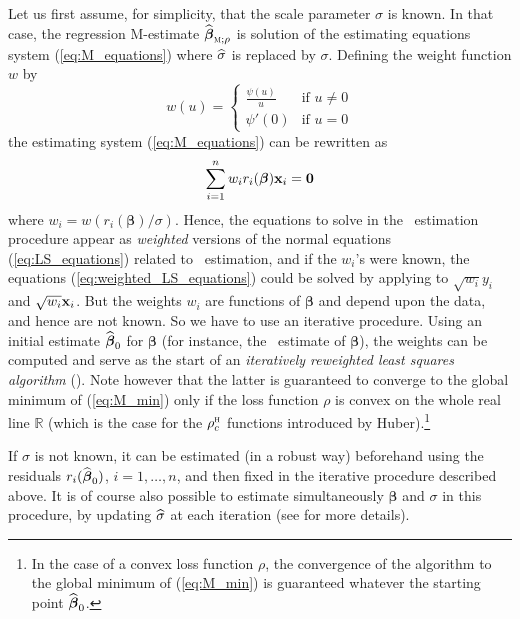 Let us first assume, for simplicity, that the scale parameter $\sigma$ is
known. In that case, the regression M-estimate
$\sthat{\boldsymbol\beta}_{\stsc{M};\rho}$ is solution of the estimating
equations system (\ref{eq:M_equations}) where $\widehat{\sigma}$ is replaced by
$\sigma$. Defining the weight function $w$ by
\[
    w(u) = 
    \begin{cases}
        \frac{\psi(u)}{u} & \text{if $u\neq0$}\\
        \psi'(0)          & \text{if $u=0$}
    \end{cases}
\]
the estimating system (\ref{eq:M_equations}) can be rewritten as
%
\begin{equation}\label{eq:weighted_LS_equations}
    \sum_{i=1}^{n} w_i r_i(\boldsymbol\beta) \mathbf x_i = \mathbf 0
\end{equation}
%
where $w_i = w(r_i(\boldsymbol\beta)/\sigma)$. Hence, the equations to solve in
the ~estimation procedure appear as \emph{weighted} versions of the
normal equations (\ref{eq:LS_equations}) related to ~estimation, and
if the $w_i$'s were known, the equations (\ref{eq:weighted_LS_equations}) could
be solved by applying  to $\sqrt{w_i}y_i$ and $\sqrt{w_i}\mathbf x_i$.
But the weights $w_i$ are functions of $\boldsymbol\beta$ and depend upon the
data, and hence are not known. So we have to use an iterative procedure. Using
an initial estimate $\widehat{\boldsymbol\beta}_0$ for $\boldsymbol\beta$ (for
instance, the ~estimate of $\boldsymbol\beta$), the weights can be
computed and serve as the start of an \emph{iteratively reweighted least
squares algorithm} (). Note however that the latter is guaranteed
to converge to the global minimum of (\ref{eq:M_min}) only if the loss function
$\rho$ is convex on the whole real line $\mathbb{R}$ (which is the case for the
$\rho_{c}^{\stsc{H}}$ functions introduced by Huber).\footnote{In the case of a
convex loss function $\rho$, the convergence of the algorithm to the global
minimum of (\ref{eq:M_min}) is guaranteed whatever the starting point
$\widehat{\boldsymbol\beta}_0$.}

If $\sigma$ is not known, it can be estimated (in a robust way) beforehand
using the residuals $r_i(\widehat{\boldsymbol\beta}_0)$, $i = 1, \dots, n$,
and then fixed in the iterative procedure described above. It is of course
also possible to estimate simultaneously $\boldsymbol\beta$ and $\sigma$ in
this procedure, by updating $\widehat{\sigma}$ at each iteration (see
\citealp{maronna:etal:2006} for more details).

